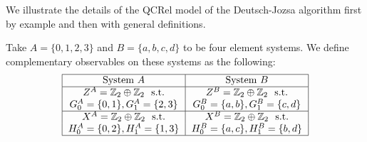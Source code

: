 We illustrate the details of the QCRel model of the Deutsch-Jozsa algorithm first by example and then with general definitions.

\begin{example}
Take $A=\{0,1,2,3\}$ and $B=\{a,b,c,d\}$ to be four element systems. We define complementary observables on these systems as the following:
\begin{align*}
\begin{tabular}{|c|c|}\hline
System $A$ & System $B$ \\\hline
$Z^A = \mathbb{Z}_2\oplus\mathbb{Z}_2 \mbox{~~s.t.}$ & $Z^B = \mathbb{Z}_2\oplus\mathbb{Z}_2\mbox{~~s.t.}$ \\
$G_0^A=\{0,1\},G_1^A=\{2,3\}$ & $G_0^B=\{a,b\},G_1^B=\{c,d\}$ \\ \hline
$X^A = \mathbb{Z}_2\oplus\mathbb{Z}_2 \mbox{~~s.t.}$ & $X^B = \mathbb{Z}_2\oplus\mathbb{Z}_2\mbox{~~s.t.}$ \\
$H_0^A=\{0,2\},H_1^A=\{1,3\}$ & $H_0^B=\{a,c\},H_1^B=\{b,d\}$ \\ \hline
\end{tabular}
\end{align*}


\end{example}
